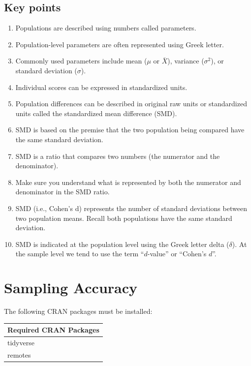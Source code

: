 \documentclass[
]{krantz}
\begin{document}
\newpage

\hypertarget{key-points}{%
\section{Key points}\label{key-points}}

\begin{enumerate}
\def\labelenumi{\arabic{enumi}.}
\item
  Populations are described using numbers called parameters.
\item
  Population-level parameters are often represented using Greek letter.
\item
  Commonly used parameters include mean (\(\mu\) or \(\bar{X}\)), variance (\(\sigma^2\)), or standard deviation (\(\sigma\)).
\item
  Individual scores can be expressed in standardized units.
\item
  Population differences can be described in original raw units or standardized units called the standardized mean difference (SMD).
\item
  SMD is based on the premise that the two population being compared have the same standard deviation.
\item
  SMD is a ratio that compares two numbers (the numerator and the denominator).
\item
  Make sure you understand what is represented by both the numerator and denominator in the SMD ratio.
\item
  SMD (i.e., Cohen's d) represents the number of standard deviations between two population means. Recall both populations have the same standard deviation.
\item
  SMD is indicated at the population level using the Greek letter delta (\(\delta\)). At the sample level we tend to use the term ``\(d\)-value'' or ``Cohen's \(d\)''.
\end{enumerate}

\hypertarget{sampling-accuracy}{%
\chapter{Sampling Accuracy}\label{sampling-accuracy}}

The following CRAN packages must be installed:

\begin{longtable}[]{@{}l@{}}
\toprule
Required CRAN Packages\tabularnewline
\midrule
\endhead
tidyverse\tabularnewline
remotes\tabularnewline
\bottomrule
\end{longtable}
\end{document}
